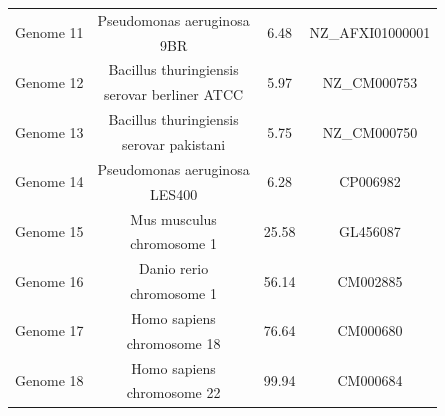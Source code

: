 \documentclass[preprint,12pt]{elsarticle}%
\begin{document}
\begin{table}[!thpb]
\begin{tabular}{c  c  c c}
\multirow{2}{*}{Genome 11}&Pseudomonas aeruginosa& \multirow{2}{*}{6.48} &\multirow{2}{*}{NZ\_AFXI01000001}\\    &9BR&\\
\hline
    
\multirow{2}{*}{Genome 12}&Bacillus thuringiensis&  \multirow{2}{*}{5.97} &\multirow{2}{*}{ NZ\_CM000753}\\    &serovar berliner ATCC &\\
\hline
    
\multirow{2}{*}{Genome 13}&Bacillus thuringiensis& \multirow{2}{*}{5.75} &\multirow{2}{*}{ NZ\_CM000750 }\\    &serovar pakistani&\\
\hline
    
\multirow{2}{*}{Genome 14}&Pseudomonas aeruginosa& \multirow{2}{*}{6.28} &\multirow{2}{*}{CP006982}\\    &LES400&\\
\hline

\multirow{2}{*}{Genome 15}& Mus musculus & \multirow{2}{*}{25.58} &\multirow{2}{*}{GL456087}\\  &chromosome 1&\\
\hline

\multirow{2}{*}{Genome 16}& Danio rerio & \multirow{2}{*}{56.14} &\multirow{2}{*}{CM002885}\\ & chromosome 1 &\\
\hline
\multirow{2}{*}{Genome 17}&Homo sapiens & \multirow{2}{*}{76.64 } &\multirow{2}{*}{  CM000680  }\\    & chromosome 18 &\\
\hline
\multirow{2}{*}{Genome 18}&Homo sapiens & \multirow{2}{*}{99.94} &\multirow{2}{*}{CM000684   }\\ & chromosome 22&\\
\hline
\end{tabular}
\end{table} 
\end{document}
